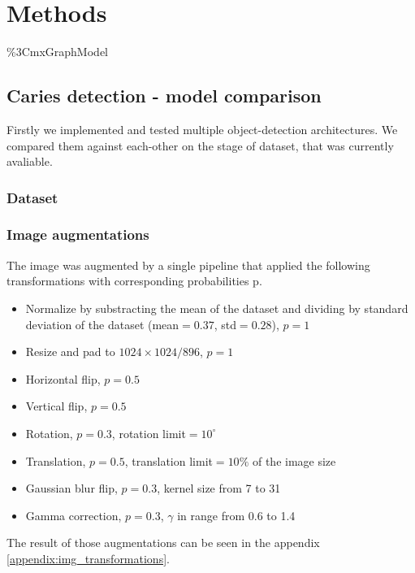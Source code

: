 \chapter{Methods}
\%3CmxGraphModel%

\section{Caries detection - model comparison}

Firstly we implemented and tested multiple object-detection architectures. We compared them against each-other on the stage of dataset, that was currently avaliable.

\subsection{Dataset}

\subsection{Image augmentations}
The image was augmented by a single pipeline that applied the following transformations with corresponding probabilities p.
\begin{itemize}
    \item Normalize by substracting the mean of the dataset and dividing by standard deviation of the dataset (mean$=0.37$, std$=0.28$), $p=1$
    \item Resize and pad to $1024\times1024/896$, $p=1$
    \item Horizontal flip, $p=0.5$
    \item Vertical flip, $p=0.5$
    \item Rotation, $p=0.3$, rotation limit$=10^{\circ}$
    \item Translation, $p=0.5$, translation limit$=10\%$ of the image size
    \item Gaussian blur flip, $p=0.3$, kernel size from 7 to 31
    \item Gamma correction, $p=0.3$, $\gamma$ in range from 0.6 to 1.4
\end{itemize}
The result of those augmentations can be seen in the appendix \ref{appendix:img_transformations}.

